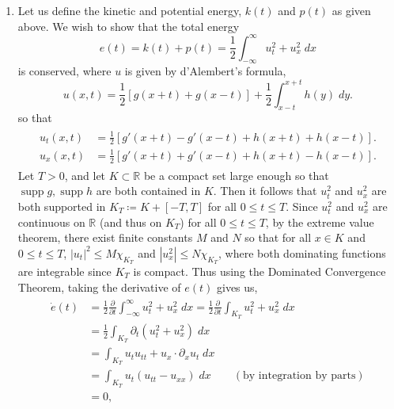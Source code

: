 \documentclass{article}
\begin{document}
	\begin{enumerate}[itemsep =-2pt,label = (\roman{*})]
		\item Let us define the kinetic and potential energy, $k(t)$ and $p(t)$ as given above. We wish to show that the total energy 
		\begin{equation*}
			e(t) = k(t) + p(t) = \frac{1}{2}\int_{-\infty}^{\infty}u_t^2 + u_x^2\;dx
		\end{equation*}
		is conserved, where $u$ is given by d'Alembert's formula, 
		\begin{equation*}
			u(x, t) = \frac{1}{2}[g(x + t) + g(x - t)] + \frac{1}{2}\int_{x - t}^{x + t}h(y)\;dy. 
		\end{equation*}
		so that 
		\begin{align*}
			\begin{split}
				u_t(x,t) &= \frac{1}{2}[g'(x + t) - g'(x - t) + h(x + t) + h(x - t)]. \\
				u_x(x, t) &= \frac{1}{2}[g'(x + t) + g'(x - t) + h(x + t) - h(x - t)]. 
			\end{split}
		\end{align*}
		Let $T > 0$, and let $K \subset \mathbb{R}$ be a compact set large enough so that $\operatorname{supp}{g}, \operatorname{supp}{h}$ are both contained in $K$. Then it follows that $u_t^2$ and $u_x^2$ are both supported in $K_{T} \coloneqq K + [-T,T]$ for all $0 \leq t \leq T$. Since $u_t^2$ and $u_x^2$ are continuous on $\mathbb{R}$ (and thus on $K_T$) for all $0 \leq t \leq T$, by the extreme value theorem, there exist finite constants $M$ and $N$ so that for all $x \in K$ and $0 \leq t \leq T$, $|u_t|^2 \leq M\chi_{K_T}$ and $|u_x^2| \leq N\chi_{K_T}$, where both dominating functions are integrable since $K_{T}$ is compact. Thus using the Dominated Convergence Theorem, taking the derivative of $e(t)$ gives us, 
		\begin{align*}
			\begin{split}
				\dot{e}(t) &= \frac{1}{2}\frac{\partial}{\partial t}\int_{-\infty}^{\infty}u_t^2 + u_x^2\;dx = \frac{1}{2}\frac{\partial}{\partial t}\int_{K_T}u_t^2 + u_x^2\;dx \\
				&= \frac{1}{2}\int_{K_T}\partial_t(u_t^2 + u_x^2)\;dx \\
				&= \int_{K_T}u_tu_{tt} + u_x \cdot \partial_x u_t\;dx \\
				&= \int_{K_T}u_t(u_{tt} - u_{xx})\;dx \qquad (\text{by integration by parts}) \\
				&= 0, 
			\end{split}
		\end{align*}	

\end{enumerate}
\end{document}

